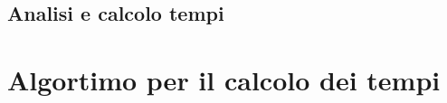\documentclass[a4paper]{article}
\begin{document}
			\newpage
			\subsection{Analisi e calcolo tempi}
			\newpage
		\section{Algortimo per il calcolo dei tempi}
	
	
	
	
\end{document}

